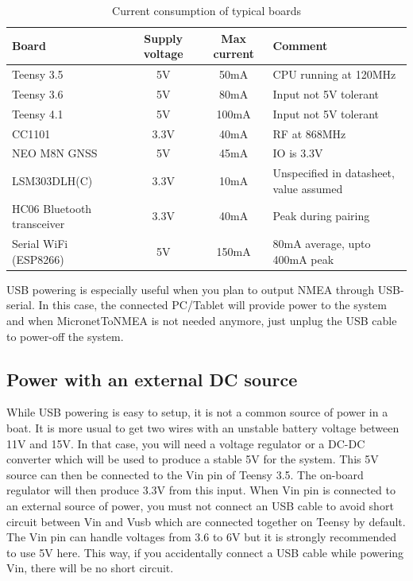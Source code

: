 \documentclass{report}
\begin{document}
\begin{table}[h]
	\begin{tabular}{|l|c|c|l|}
		\hline
		Board & Supply voltage & Max current & Comment \\
		\hline
		Teensy 3.5 & 5V & 50mA & CPU running at 120MHz\\
		Teensy 3.6 & 5V & 80mA & Input not 5V tolerant\\
		Teensy 4.1 & 5V & 100mA & Input not 5V tolerant\\
		CC1101 & 3.3V & 40mA & RF at 868MHz\\
		NEO M8N GNSS & 5V & 45mA & IO is 3.3V\\
		LSM303DLH(C) & 3.3V & 10mA & Unspecified in datasheet, value assumed\\
		HC06 Bluetooth transceiver & 3.3V & 40mA & Peak during pairing\\
		Serial WiFi (ESP8266) & 5V & 150mA & 80mA average, upto 400mA peak\\
		\hline
	\end{tabular}
	\caption{Current consumption of typical boards}
	\label{table:boardconsumption}
\end{table}
USB powering is especially useful when you plan to output NMEA through USB-serial. In this case, the connected PC/Tablet will provide power to the system and when MicronetToNMEA is not needed anymore, just unplug the USB cable to power-off the system.

\subsection{Power with an external DC source}
While USB powering is easy to setup, it is not a common source of power in a boat. It is more usual to get two wires with an unstable battery voltage between 11V and 15V. In that case, you will need a voltage regulator or a DC-DC converter which will be used to produce a stable 5V for the system. This 5V source can then be connected to the Vin pin of Teensy 3.5. The on-board regulator will then produce 3.3V from this input.
\linebreak
When Vin pin is connected to an external source of power, you must not connect an USB cable to avoid short circuit between Vin and Vusb which are connected together on Teensy by default. The Vin pin can handle voltages from 3.6 to 6V but it is strongly recommended to use 5V here. This way, if you accidentally connect a USB cable while powering Vin, there will be no short circuit.
\end{document}
